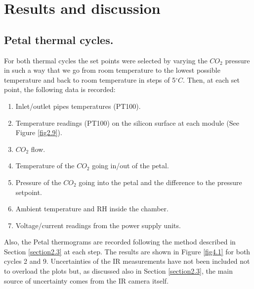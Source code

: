 \pagestyle{standard}

\chapter{Results and discussion}\label{chapter4}

	\thispagestyle{chapter-first-page}

	\section{Petal thermal cycles.}\label{section4.1}
	
		For both thermal cycles the set points were selected by varying the $CO_{2}$ pressure in such a way that we go from room temperature to the lowest possible temperature and back to room temperature in steps of 5\space$^\circ C$. Then, at each set point, the following data is recorded:
	
		\begin{enumerate}[label={\arabic*)}]
			\item Inlet/outlet pipes temperatures (PT100).
			\item Temperature readings (PT100) on the silicon surface at each module (See Figure \ref{fig2.9}).
			\item $CO_{2}$ flow.
			\item Temperature of the $CO_{2}$ going in/out of the petal.
			\item Pressure of the $CO_{2}$ going into the petal and the difference to the pressure setpoint.
			\item Ambient temperature and RH inside the chamber.
			\item Voltage/current readings from the power supply units.
		\end{enumerate}
	
		Also, the Petal thermograms are recorded following the method described in Section \ref{section2.3} at each step. The results are shown in Figure \ref{fig4.1} for both cycles 2 and 9. Uncertainties of the IR measurements have not been included not to overload the plots but, as discussed also in Section \ref{section2.3}, the main source of uncertainty comes from the IR camera itself. 
	
